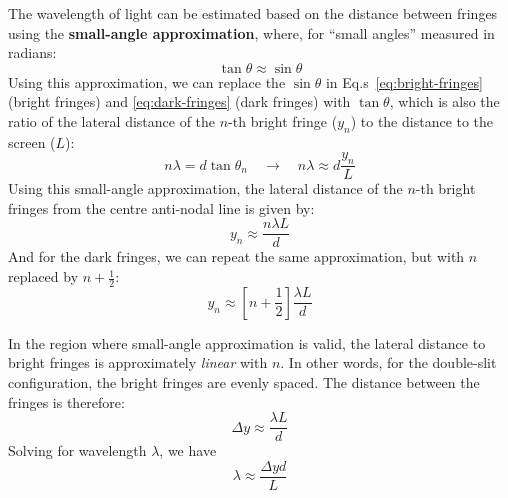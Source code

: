The wavelength of light can be estimated based on the distance between fringes
using the \textbf{small-angle approximation}, where, for ``small angles''
measured in radians:
\begin{equation}
  \tan\theta\approx\sin\theta
\end{equation}
Using this approximation, we can replace the $\sin\theta$ in
Eq.s~\ref{eq:bright-fringes} (bright fringes) and
\ref{eq:dark-fringes} (dark fringes) with $\tan\theta$, which is also the
ratio of the lateral distance of the $n$-th bright fringe ($y_n$) to the
distance to the screen ($L$):
\begin{equation*}
  n\lambda=
  d\tan\theta_n
  \quad\rightarrow\quad
  n\lambda\approx
  d\frac{y_n}L
\end{equation*}
Using this small-angle approximation, the lateral distance of the $n$-th bright
fringes from the centre anti-nodal line is given by:
\begin{equation} 
  \boxed{
    y_n\approx\frac{n\lambda L}d
  }
\end{equation}
And for the dark fringes, we can repeat the same approximation, but with $n$
replaced by $n+\frac12$:
\begin{equation}
  \boxed{
    y_n\approx\left[n+\frac12\right]\frac{\lambda L}d
  }
\end{equation}

In the region where small-angle approximation is valid, the lateral distance
to bright fringes is approximately \emph{linear} with $n$. In other words, for
the double-slit configuration, the bright fringes are evenly spaced. The
distance between the fringes is therefore:
\begin{equation*}
  \Delta y\approx\frac{\lambda L}d
\end{equation*}
Solving for wavelength $\lambda$, we have
\begin{equation}
  \boxed{\lambda\approx\frac{\Delta yd}L}
  \label{eq:wavelength-approximation}
\end{equation}





